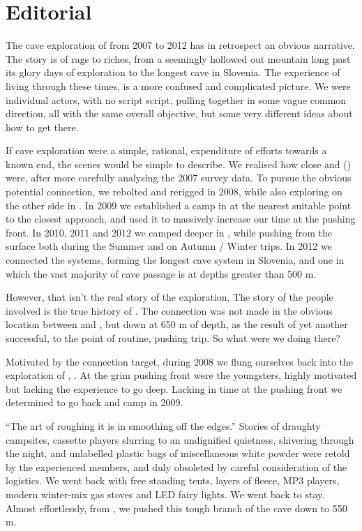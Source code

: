\chapter*{Editorial}

The cave exploration of  from 2007 to 2012 has in
retrospect an obvious narrative. The story is of rags to riches, from a
seemingly hollowed out mountain long past its glory days of exploration
to the longest cave in Slovenia. The experience of living through these
times, is a more confused and complicated picture. We were individual
actors, with no script script, pulling together in some vague common
direction, all with the same overall objective, but some very different
ideas about how to get there.

If cave exploration were a simple, rational, expenditure of efforts
towards a known end, the scenes would be simple to describe. We realised
how close  and  () were, after more
carefully analysing the 2007  survey data. To pursue
the obvious potential connection, we rebolted and rerigged 
in 2008, while also exploring on the other side in . In 2009 we established a camp in  at the nearest suitable point to the closest approach, and used it to massively increase our time at the pushing front. In 2010, 2011 and 2012 we camped deeper in ,
while pushing  from the surface both during the Summer and on
Autumn / Winter trips. In 2012 we connected the systems, forming the
longest cave system in Slovenia, and one in which the vast majority of
cave passage is at depths greater than 500 m.

However, that isn't the real story of the exploration. The story of the
people involved is the true history of . The connection was not
made in the obvious location between  and , but down
at 650 m of depth, as the result of yet another successful, to the point
of routine, pushing trip. So what were we doing there?

Motivated by the connection target, during 2008 we flung ourselves back into the exploration of , . At the grim pushing front were the youngsters, highly motivated but lacking the experience to go deep. Lacking in time at the pushing front we determined to go back and camp in 2009. 

``The art of roughing it is in smoothing off the edges.'' Stories of draughty campsites, cassette players slurring to an undignified quietness, shivering through the night, and unlabelled plastic bags of miscellaneous white powder were retold by the experienced members, and duly obsoleted by careful consideration of the logistics. We went back with free standing tents, layers of fleece, MP3 players, modern winter-mix gas stoves and LED fairy lights. We went back to stay. Almost effortlessly, from , we pushed this tough branch of the cave down to 550 m.


